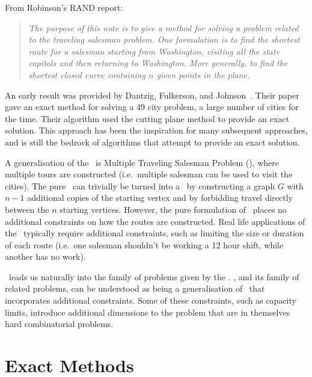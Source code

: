 \clearpage

From Robinson's RAND report:
\begin{quote}
\itshape
   The purpose of this note is to give a method for solving a problem related to the traveling salesman problem. One formulation is to find the shortest route for a salesman starting from Washington, visiting all the state capitals and then returning to Washington. More generally, to find the shortest closed curve containing $n$ given points in the plane.
\end{quote}


An early result was provided by Dantzig, Fulkerson, and  Johnson~\cite{Dantzig:1954}. Their paper gave an exact method for solving a 49 city problem, a large number of cities for the time. Their algorithm used the cutting plane method to provide an exact solution. This approach has been the inspiration for many subsequent approaches, and is still the bedrock of algorithms that attempt to provide an exact solution.  

A generalisation of the \TSP\ is Multiple Traveling Salesman Problem (\MTSP), where multiple tours are constructed (i.e.~multiple salesman can be used to visit the cities). The pure \MTSP\ can trivially be turned into a \TSP\ by constructing a graph $G$ with $n - 1$ additional copies of the starting vertex and by forbidding travel directly between the $n$ starting vertices. However, the pure formulation of \MTSP\ places no additional constraints on how the routes are constructed. Real life applications of the \MTSP\ typically require additional constraints, such as limiting the size or duration of each route (i.e.~one salesman shouldn't be working a 12 hour shift, while another has no work).

\MTSP\ leads us naturally into the family of problems given by the \VRP. \VRP, and its family of related problems, can be understood as being a generalisation of \MTSP\ that incorporates additional constraints. Some of these constraints, such as capacity limits, introduce additional dimensions to the problem that are in themselves hard combinatorial problems.

\section{Exact Methods}
\label{sec:em}

